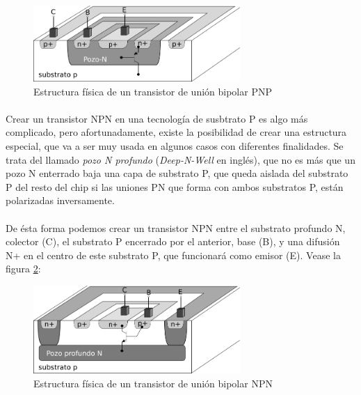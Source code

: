 \begin{figure}[h]
	\centering
	\includegraphics[width=0.7\textwidth]{img/pnp.png}
	\caption{Estructura física de un transistor de unión bipolar PNP}
	\label{fig:pnp}
\end{figure}

\paragraph{}
Crear un transistor NPN en una tecnología de susbtrato P es algo más complicado,
pero afortunadamente, existe la posibilidad de crear una estructura especial, que
va a ser muy usada en algunos casos con diferentes finalidades. Se trata del
llamado \textit{pozo N profundo} (\textit{Deep-N-Well} en inglés), que no
es más que un pozo N enterrado baja una capa de substrato P, que queda aislada del
substrato P del resto del chip si las uniones PN que forma con ambos substratos P,
están polarizadas inversamente.

\paragraph{}
De ésta forma podemos crear un transistor NPN entre el substrato profundo N,
colector (C), el substrato P encerrado por el anterior, base (B), y una difusión
N+ en el centro de este substrato P, que funcionará como emisor (E). Vease la
figura \ref{fig:npn}:

\begin{figure}[h]
	\centering
	\includegraphics[width=0.7\textwidth]{img/npn.png}
	\caption{Estructura física de un transistor de unión bipolar NPN}
	\label{fig:npn}
\end{figure}


